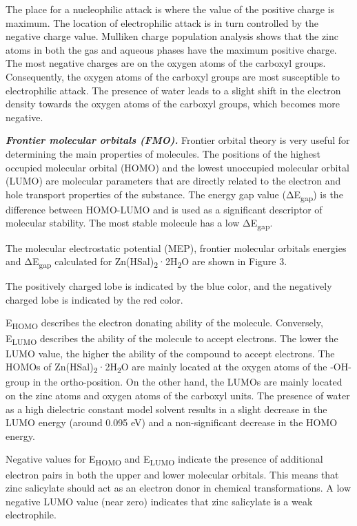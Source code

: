 \begin{multicols}{2}
The place for a nucleophilic attack is where the value of the positive
charge is maximum. The location of electrophilic attack is in turn
controlled by the negative charge value. Mulliken charge population
analysis shows that the zinc atoms in both the gas and aqueous phases
have the maximum positive charge. The most negative charges are on the
oxygen atoms of the carboxyl groups. Consequently, the oxygen atoms of
the carboxyl groups are most susceptible to electrophilic attack. The
presence of water leads to a slight shift in the electron density
towards the oxygen atoms of the carboxyl groups, which becomes more
negative.

\emph{{\bfseries Frontier molecular orbitals (FMO).}} Frontier orbital
theory is very useful for determining the main properties of molecules.
The positions of the highest occupied molecular orbital (HOMO) and the
lowest unoccupied molecular orbital (LUMO) are molecular parameters that
are directly related to the electron and hole transport properties of
the substance. The energy gap value (ΔE\textsubscript{gap}) is the
difference between HOMO-LUMO and is used as a significant descriptor of
molecular stability. The most stable molecule has a low
ΔE\textsubscript{gap}.

The molecular electrostatic potential (MEP), frontier molecular orbitals
energies and ΔE\textsubscript{gap} calculated for
Zn(HSal)\textsubscript{2}·2H\textsubscript{2}O are shown in Figure 3.

The positively charged lobe is indicated by the blue color, and the
negatively charged lobe is indicated by the red color.

E\textsubscript{HOMO} describes the electron donating ability of the
molecule. Conversely, E\textsubscript{LUMO} describes the ability of the
molecule to accept electrons. The lower the LUMO value, the higher the
ability of the compound to accept electrons. The HOMOs of
Zn(HSal)\textsubscript{2}·2H\textsubscript{2}O are mainly located at the
oxygen atoms of the -OH-group in the ortho-position. On the other hand,
the LUMOs are mainly located on the zinc atoms and oxygen atoms of the
carboxyl units. The presence of water as a high dielectric constant
model solvent results in a slight decrease in the LUMO energy (around
0.095 eV) and a non-significant decrease in the HOMO energy.

Negative values for E\textsubscript{HOMO} and E\textsubscript{LUMO}
indicate the presence of additional electron pairs in both the upper and
lower molecular orbitals. This means that zinc salicylate should act as
an electron donor in chemical transformations. A low negative LUMO value
(near zero) indicates that zinc salicylate is a weak electrophile.


\end{multicols}
